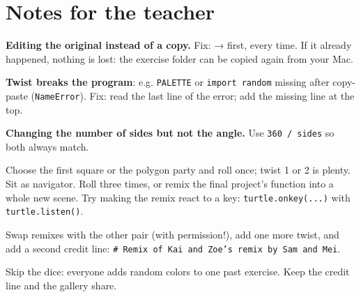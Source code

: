 \section{Notes for the teacher}
\begin{commonmistakes}
  \item \textbf{Editing the original instead of a copy.} Fix:  →  first, every time. If it already happened, nothing is lost: the exercise folder can be copied again from your Mac.
  \item \textbf{Twist breaks the program}: e.g. \texttt{PALETTE} or \texttt{import random} missing after copy-paste (\texttt{NameError}). Fix: read the last line of the error; add the missing line at the top.
  \item \textbf{Changing the number of sides but not the angle.} Use \texttt{360 / sides} so both always match.
\end{commonmistakes}
\begin{differentiation}
\supportpath Choose the first square or the polygon party and roll once; twist 1 or 2 is plenty. Sit as navigator.
\extensionpath Roll three times, or remix the final project's function into a whole new scene. Try making the remix react to a key: \texttt{turtle.onkey(...)} with \texttt{turtle.listen()}.
\end{differentiation}
\begin{stretchchallenge}
Swap remixes with the other pair (with permission!), add one more twist, and add a second credit line: \texttt{\# Remix of Kai and Zoe's remix by Sam and Mei}.
\end{stretchchallenge}
\begin{teachernote}
Skip the dice: everyone adds random colors to one past exercise. Keep the credit line and the gallery share.
\end{teachernote}
